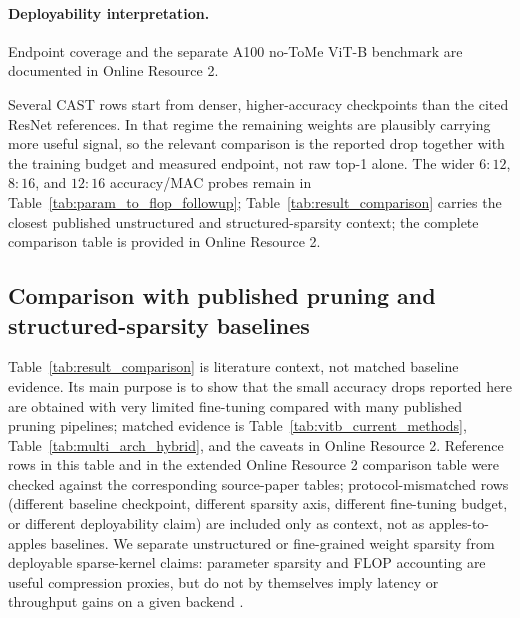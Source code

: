 \documentclass[11pt]{article}
\theoremstyle{plain}
\theoremstyle{definition}
\theoremstyle{remark}
\newcommand{\1}{\mathbf{1}}
\begin{document}
\paragraph{Deployability interpretation.}
Endpoint coverage and the separate A100 no-ToMe ViT-B benchmark are documented in Online Resource 2.

Several CAST rows start from denser, higher-accuracy checkpoints than the cited ResNet references. In that regime the remaining weights are plausibly carrying more useful signal, so the relevant comparison is the reported drop together with the training budget and measured endpoint, not raw top-1 alone. The wider \(6{:}12\), \(8{:}16\), and \(12{:}16\) accuracy/MAC probes remain in Table~\ref{tab:param_to_flop_followup}; Table~\ref{tab:result_comparison} carries the closest published unstructured and structured-sparsity context; the complete comparison table is provided in Online Resource 2.



\subsection{Comparison with published pruning and structured-sparsity baselines}
\label{subsec:result_comparison}

Table~\ref{tab:result_comparison} is literature context, not matched baseline evidence. Its main purpose is to show that the small accuracy drops reported here are obtained with very limited fine-tuning compared with many published pruning pipelines; matched evidence is Table~\ref{tab:vitb_current_methods}, Table~\ref{tab:multi_arch_hybrid}, and the caveats in Online Resource 2. Reference rows in this table and in the extended Online Resource 2 comparison table were checked against the corresponding source-paper tables; protocol-mismatched rows (different baseline checkpoint, different sparsity axis, different fine-tuning budget, or different deployability claim) are included only as context, not as apples-to-apples baselines. We separate unstructured or fine-grained weight sparsity from deployable sparse-kernel claims: parameter sparsity and FLOP accounting are useful compression proxies, but do not by themselves imply latency or throughput gains on a given backend \cite{gale2019state,blalock2020state,hoefler2021sparsity}.
\end{document}
